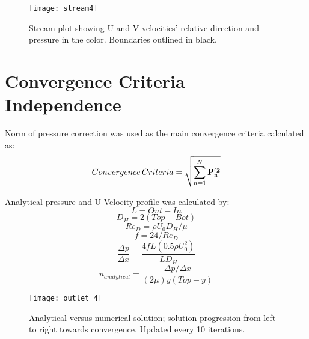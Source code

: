 \documentclass[10pt,english]{article}
\begin{document}
\begin{figure}[htbp]
\centering
\texttt{[image: stream4]}
\vspace{-5pt}
\caption{Stream plot showing U and V velocities' relative direction and pressure in the color. Boundaries outlined in black.}
\label{f:3b}
\end{figure}




\FloatBarrier
\section{Convergence Criteria Independence}



\noindent Norm of pressure correction was used as the main convergence criteria calculated as:
    \begin{equation}
      Convergence\,Criteria = \sqrt{\sum_{n=1}^N \bf P_{\rm n}^{'2}}
    \end{equation}


\noindent Analytical pressure and U-Velocity profile was calculated by: 
\begin{equation}
            L = Out-In
\end{equation}
\begin{equation}
            D_H = 2 (Top-Bot)
            \end{equation}
            \begin{equation}
            Re_D = \rho U_0 D_H / \mu
            \end{equation}
            \begin{equation}
            f = 24/Re_D
            \end{equation}
            \begin{equation}
            \frac{\Delta p}{\Delta x} = \frac{4 f L (0.5 \rho U_0^2)}{L D_H}
            \end{equation}
            \begin{equation}
            u_{analytical} = \frac{{\Delta p}/{\Delta x}}{(2 \mu) y (Top-y)}
            \end{equation}
      
\begin{figure}[htbp]
\centering
\texttt{[image: outlet\_4]}
\vspace{-5pt}
\caption{Analytical versus numerical solution; solution progression from left to right towards convergence.  Updated every 10 iterations.}
\label{f:3b}
\end{figure}
\end{document}
